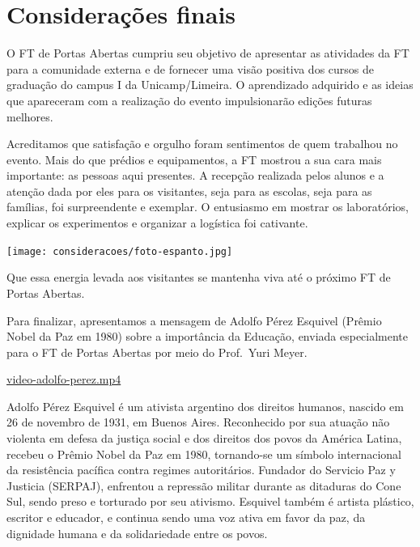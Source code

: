 \documentclass[
  letterpaper,
  DIV=11,
  numbers=noendperiod]{scrreprt}
\begin{document}

\chapter{Considerações finais}\label{considerauxe7uxf5es-finais}

O FT de Portas Abertas cumpriu seu objetivo de apresentar as atividades
da FT para a comunidade externa e de fornecer uma visão positiva dos
cursos de graduação do campus I da Unicamp/Limeira. O aprendizado
adquirido e as ideias que apareceram com a realização do evento
impulsionarão edições futuras melhores.

Acreditamos que satisfação e orgulho foram sentimentos de quem trabalhou
no evento. Mais do que prédios e equipamentos, a FT mostrou a sua cara
mais importante: as pessoas aqui presentes. A recepção realizada pelos
alunos e a atenção dada por eles para os visitantes, seja para as
escolas, seja para as famílias, foi surpreendente e exemplar. O
entusiasmo em mostrar os laboratórios, explicar os experimentos e
organizar a logística foi cativante.

\texttt{[image: consideracoes/foto-espanto.jpg]}

Que essa energia levada aos visitantes se mantenha viva até o próximo FT
de Portas Abertas.

Para finalizar, apresentamos a mensagem de Adolfo Pérez Esquivel (Prêmio
Nobel da Paz em 1980) sobre a importância da Educação, enviada
especialmente para o FT de Portas Abertas por meio do Prof.~Yuri Meyer.

\url{video-adolfo-perez.mp4}

\begin{tcolorbox}[enhanced jigsaw, leftrule=.75mm, toprule=.15mm, opacitybacktitle=0.6, bottomtitle=1mm, breakable, rightrule=.15mm, titlerule=0mm, colback=white, colbacktitle=quarto-callout-caution-color!10!white, title=\textcolor{quarto-callout-caution-color}{\faFire}\hspace{0.5em}{Adolfo Pérez Esquivel}, toptitle=1mm, arc=.35mm, left=2mm, opacityback=0, coltitle=black, bottomrule=.15mm, colframe=quarto-callout-caution-color-frame]

Adolfo Pérez Esquivel é um ativista argentino dos direitos humanos,
nascido em 26 de novembro de 1931, em Buenos Aires. Reconhecido por sua
atuação não violenta em defesa da justiça social e dos direitos dos
povos da América Latina, recebeu o Prêmio Nobel da Paz em 1980,
tornando-se um símbolo internacional da resistência pacífica contra
regimes autoritários. Fundador do Servicio Paz y Justicia (SERPAJ),
enfrentou a repressão militar durante as ditaduras do Cone Sul, sendo
preso e torturado por seu ativismo. Esquivel também é artista plástico,
escritor e educador, e continua sendo uma voz ativa em favor da paz, da
dignidade humana e da solidariedade entre os povos.

\end{tcolorbox}
\end{document}
